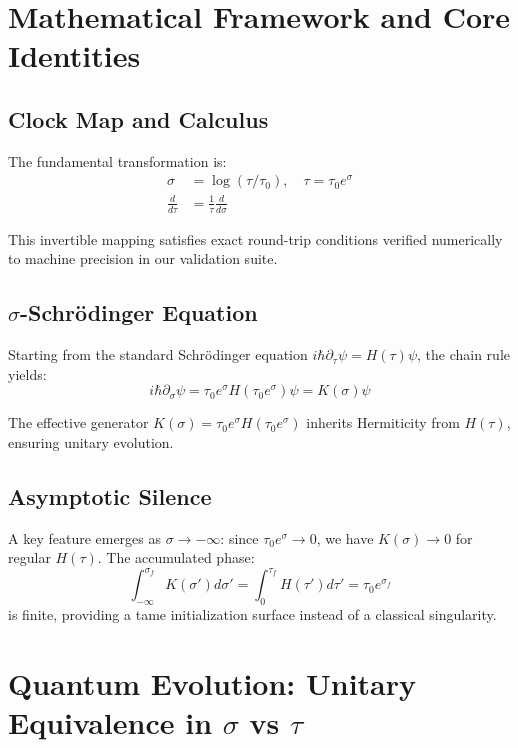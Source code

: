 \documentclass[11pt]{article}
\begin{document}
\section{Mathematical Framework and Core Identities}

\subsection{Clock Map and Calculus}

The fundamental transformation is:
\begin{align}
\sigma &= \log(\tau/\tau_0), \quad \tau = \tau_0 e^\sigma \\
\frac{d}{d\tau} &= \frac{1}{\tau} \frac{d}{d\sigma}
\end{align}

This invertible mapping satisfies exact round-trip conditions verified numerically to machine precision in our validation suite.

\subsection{$\sigma$-Schrödinger Equation}

Starting from the standard Schrödinger equation $i\hbar \partial_\tau \psi = H(\tau)\psi$, the chain rule yields:
\begin{equation}
i\hbar \partial_\sigma \psi = \tau_0 e^\sigma H(\tau_0 e^\sigma) \psi = K(\sigma) \psi
\end{equation}

The effective generator $K(\sigma) = \tau_0 e^\sigma H(\tau_0 e^\sigma)$ inherits Hermiticity from $H(\tau)$, ensuring unitary evolution.

\subsection{Asymptotic Silence}

A key feature emerges as $\sigma \to -\infty$: since $\tau_0 e^\sigma \to 0$, we have $K(\sigma) \to 0$ for regular $H(\tau)$. The accumulated phase:
\begin{equation}
\int_{-\infty}^{\sigma_f} K(\sigma') d\sigma' = \int_0^{\tau_f} H(\tau') d\tau' = \tau_0 e^{\sigma_f}
\end{equation}
is finite, providing a tame initialization surface instead of a classical singularity.

\section{Quantum Evolution: Unitary Equivalence in $\sigma$ vs $\tau$}
\end{document}
